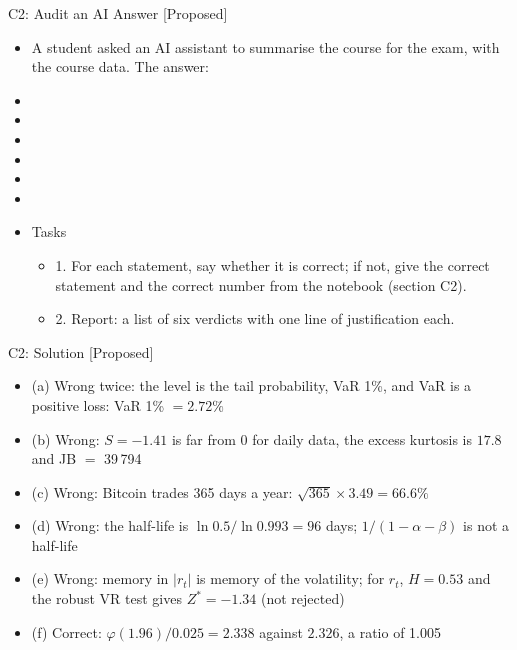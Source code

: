 \begin{frame}{C2: Audit an AI Answer [Proposed]}
\itemsize{\scriptsize}
\begin{itemize}
    \item A student asked an AI assistant to summarise the course for the exam, with the course data. The answer:
    \item {}
    \item {}
    \item {}
    \item {}
    \item {}
    \item {}
    \item Tasks
    \begin{itemize}
        \item 1. For each statement, say whether it is correct; if not, give the correct statement and the correct number from the notebook (section C2).
        \item 2. Report: a list of six verdicts with one line of justification each.
    \end{itemize}
\end{itemize}
\end{frame}

\ifsolutions
\begin{frame}{C2: Solution [Proposed]}
\itemsize{\footnotesize}
\begin{itemize}
    \item (a) Wrong twice: the level is the tail probability, VaR 1\%, and VaR is a positive loss: VaR 1\% $= 2.72\%$
    \item (b) Wrong: $S = -1.41$ is far from 0 for daily data, the excess kurtosis is $17.8$ and JB $=$ 39\,794
    \item (c) Wrong: Bitcoin trades 365 days a year: $\sqrt{365} \times 3.49 = 66.6\%$
    \item (d) Wrong: the half-life is $\ln 0.5/\ln 0.993 = 96$ days; $1/(1 - \alpha - \beta)$ is not a half-life
    \item (e) Wrong: memory in $|r_t|$ is memory of the volatility; for $r_t$, $H = 0.53$ and the robust VR test gives $Z^* = -1.34$ (not rejected)
    \item (f) Correct: $\varphi(1.96)/0.025 = 2.338$ against $2.326$, a ratio of 1.005
\end{itemize}
\end{frame}
\fi



